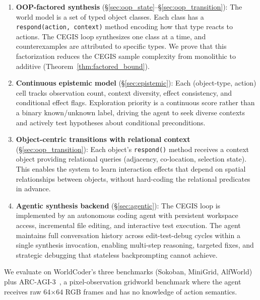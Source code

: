\documentclass{article}
\begin{document}
\begin{enumerate}[nosep]
    \item \textbf{OOP-factored synthesis} (\S\ref{sec:oop_state}--\S\ref{sec:oop_transition}):
          The world model is a set of typed object classes.  Each class has a
          \texttt{respond(action, context)} method encoding how that type reacts
          to actions.  The CEGIS loop synthesizes one class at a time, and
          counterexamples are attributed to specific types.  We prove that this
          factorization reduces the CEGIS sample complexity from monolithic to
          additive (Theorem~\ref{thm:factored_bound}).

    \item \textbf{Continuous epistemic model} (\S\ref{sec:epistemic}):
          Each (object-type, action) cell tracks observation count, context
          diversity, effect consistency, and conditional effect flags.
          Exploration priority is a continuous score rather than a binary
          known/unknown label, driving the agent to seek diverse contexts and
          actively test hypotheses about conditional preconditions.

    \item \textbf{Object-centric transitions with relational context}
          (\S\ref{sec:oop_transition}):
          Each object's \texttt{respond()} method receives a context object
          providing relational queries (adjacency, co-location, selection state).
          This enables the system to learn interaction effects that depend on
          spatial relationships between objects, without hard-coding the
          relational predicates in advance.

    \item \textbf{Agentic synthesis backend} (\S\ref{sec:agentic}):
          The CEGIS loop is implemented by an autonomous coding agent with
          persistent workspace access, incremental file editing, and
          interactive test execution.  The agent maintains full conversation
          history across edit-test-debug cycles within a single synthesis
          invocation, enabling multi-step reasoning, targeted fixes, and
          strategic debugging that stateless backprompting cannot achieve.
\end{enumerate}

We evaluate on WorldCoder's three benchmarks (Sokoban, MiniGrid, AlfWorld)
plus ARC-AGI-3~\cite{arcagi3}, a pixel-observation gridworld benchmark where
the agent receives raw 64$\times$64 RGB frames and has no knowledge of action
semantics.
\end{document}

